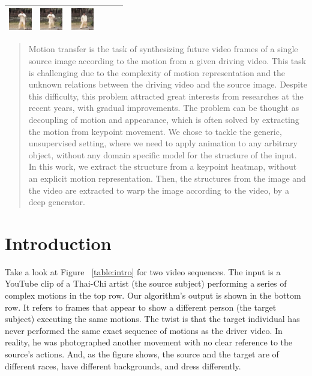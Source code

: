 \documentclass{article}
\begin{document}
\begin{table}[t]
\begin{center}
\begin{small}
\begin{sc}
\begin{tabular}{m{1.0cm}m{1.0cm}m{1.0cm}m{1.0cm}m{1.0cm}m{1.0cm}}
\includegraphics[width=1cm, height=1cm]{images/intro_image/Recon_4.png} &
\includegraphics[width=1cm, height=1cm]{images/intro_image/Recon_5.png} &
\includegraphics[width=1cm, height=1cm]{images/intro_image/Recon_6.png}\\
\bottomrule
\end{tabular}
\end{sc}
\end{small}
\end{center}
\vskip -0.1in
\end{table}

\begin{abstract}
Motion transfer is the task of synthesizing future video frames of a single
source image according to the motion from a given driving video.
This task is challenging due to the complexity of motion representation
and the unknown relations between the driving video and the source image.
Despite this difficulty, this problem attracted great interests from
researches at the recent years, with gradual improvements. The
problem can be thought as decoupling of motion and appearance, which is
often solved by extracting the motion from keypoint movement.
We chose to tackle the generic, unsupervised setting, where we need to apply
animation to any arbitrary object, without any domain specific model for the
structure of the input.
In this work, we extract the structure from a keypoint heatmap, without an
explicit motion representation. Then, the structures from the image and the video
are extracted to warp the image according to the video, by a deep
generator.
\end{abstract}

\section{Introduction}
Take a look at Figure ~\ref{table:intro} for two video sequences. The input
is a YouTube clip of a Thai-Chi artist (the source subject) performing a
series of complex motions in the top row. Our algorithm's output is shown in
the bottom row. It refers to frames that appear to show a different person
(the target subject) executing the same motions. The twist is that the
target individual has never performed the same exact sequence of motions as
the driver video. In reality, he was photographed another movement with no clear
reference to the source's actions.
And, as the figure shows, the source and the target are of different races,
have different backgrounds, and dress differently.
\end{document}
